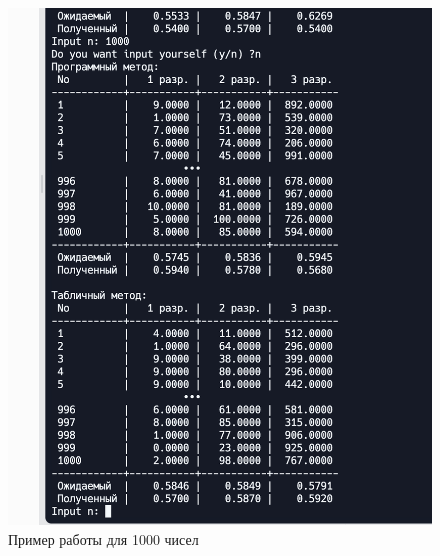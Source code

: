 \documentclass[a4paper, 12pt]{article}
\begin{document}
\begin{figure}[t!]
	\centering \includegraphics[scale=0.7]{1000}
	\centering\caption{Пример работы для 1000 чисел}
\end{figure}
\clearpage
\newpage
\clearpage
\newpage
\end{document}
